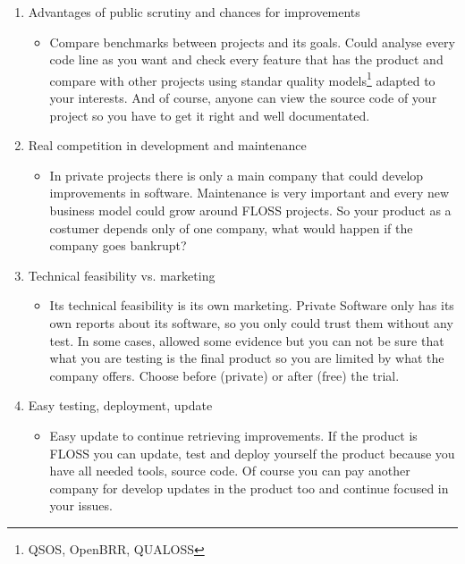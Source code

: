\begin{enumerate}

    \item Advantages of public scrutiny and chances for improvements
    \begin{itemize}
        \item Compare benchmarks between projects and its goals. Could analyse every code line as you want and check every feature that has the product and compare with other projects using standar quality models\footnote{QSOS, OpenBRR, QUALOSS} adapted to your interests. And of course, anyone can view the source code of your project so you have to get it right and well documentated.
    \end{itemize}

    \item Real competition in development and maintenance
    \begin{itemize}
        \item In private projects there is only a main company that could develop improvements in software. Maintenance is very important and every new business model could grow around FLOSS projects. So your product as a costumer depends only of one company, what would happen if the company goes bankrupt?
    \end{itemize}

    \item Technical feasibility vs. marketing
    \begin{itemize}
        \item Its technical feasibility is its own marketing. Private Software only has its own reports about its software, so you only could trust them without any test. In some cases, allowed some evidence but you can not be sure that what you are testing is the final product so you are limited by what the company offers. Choose before (private) or after (free) the trial.
    \end{itemize}

    \item Easy testing, deployment, update
    \begin{itemize}
        \item Easy update to continue retrieving improvements. If the product is FLOSS you can update, test and deploy yourself the product because you have all needed tools, source code. Of course you can pay another company for develop updates in the product too and continue focused in your issues.
    \end{itemize}


\end{enumerate}
